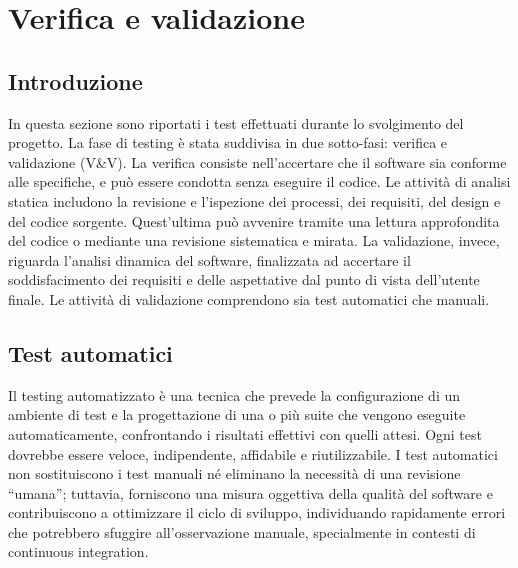 \chapter{Verifica e validazione}
\label{cap:verifica-validazione}


\section{Introduzione}
\label{sec:introduzione-testing}

\par In questa sezione sono riportati i test effettuati durante lo svolgimento del progetto. La fase di testing è stata suddivisa in due sotto-fasi: verifica e validazione (V\&V). La verifica consiste nell’accertare che il software sia conforme alle specifiche, e può essere condotta senza eseguire il codice. Le attività di analisi statica includono la revisione e l’ispezione dei processi, dei \gls{requisiti}, del design e del codice sorgente. Quest’ultima può avvenire tramite una lettura approfondita del codice o mediante una revisione sistematica e mirata. La validazione, invece, riguarda l’analisi dinamica del software, finalizzata ad accertare il soddisfacimento dei \gls{requisiti} e delle aspettative dal punto di vista dell’utente finale. Le attività di validazione comprendono sia test automatici che manuali.


\section{Test automatici}

\par Il testing automatizzato è una tecnica che prevede la configurazione di un ambiente di test e la progettazione di una o più suite che vengono eseguite automaticamente, confrontando i risultati effettivi con quelli attesi. Ogni test dovrebbe essere veloce, indipendente, affidabile e riutilizzabile. I test automatici non sostituiscono i test manuali né eliminano la necessità di una revisione “umana”; tuttavia, forniscono una misura oggettiva della qualità del software e contribuiscono a ottimizzare il ciclo di sviluppo, individuando rapidamente errori che potrebbero sfuggire all’osservazione manuale, specialmente in contesti di \gls{continuous integration}.


